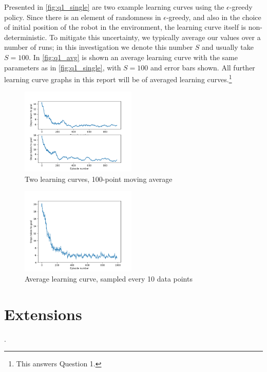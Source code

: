 \documentclass[a4paper, 11pt, twocolumn, draft]{article} %
\begin{document}
Presented in \autoref{fig:q1_single} are two example learning curves using the
$\epsilon$-greedy policy.  Since there is an element of randomness in
$\epsilon$-greedy, and also in the choice of initial position of the robot in
the environment, the learning curve itself is non-deterministic.  To mitigate
this uncertainty, we typically average our values over a number of runs; in this
investigation we denote this number $S$ and usually take $S = 100$.  In
\autoref{fig:q1_avg} is shown an average learning curve with the same parameters
as in \autoref{fig:q1_single}, with $S = 100$ and error bars shown.  All further
learning curve graphs in this report will be of averaged learning
curves.\footnote{This answers Question 1.}

\begin{figure}
  \includegraphics[width=0.49\textwidth]{figures/q1_figure_single.png}
  \caption{Two learning curves, 100-point moving average}
  \label{fig:q1_single}
\end{figure}

\begin{figure}
  \includegraphics[width=0.49\textwidth]{figures/q1_figure_avg.png}
  \caption{Average learning curve, sampled every 10 data points}
  \label{fig:q1_avg}
\end{figure}

\section{Extensions} .
\end{document}
